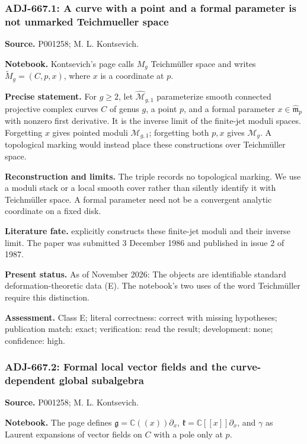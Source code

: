 \subsubsection{ADJ-667.1: A curve with a point and a formal parameter is not unmarked Teichmueller space}
\noindent\textbf{Source.} P001258; M. L. Kontsevich.\par
\noindent\textbf{Notebook.} Kontsevich's page calls \(M_g\) Teichm\"uller space and writes \(\widetilde M_g=(C,p,x)\), where \(x\) is a coordinate at \(p\).\par

\noindent\textbf{Precise statement.} For \(g\ge2\), let \(\widehat{\mathcal M}_{g,1}\) parameterize smooth connected projective complex curves \(C\) of genus \(g\), a point \(p\), and a formal parameter \(x\in\widehat{\mathfrak m}_p\) with nonzero first derivative. It is the inverse limit of the finite-jet moduli spaces. Forgetting \(x\) gives pointed moduli \(\mathcal M_{g,1}\); forgetting both \(p,x\) gives \(\mathcal M_g\). A topological marking would instead place these constructions over Teichm\"uller space.\par

\noindent\textbf{Reconstruction and limits.} The triple records no topological marking. We use a moduli stack or a local smooth cover rather than silently identify it with Teichm\"uller space. A formal parameter need not be a convergent analytic coordinate on a fixed disk.\par

\noindent\textbf{Literature fate.} \citet[\S1]{kontsevich1987virasoro} explicitly constructs these finite-jet moduli and their inverse limit. The paper was submitted 3 December 1986 and published in issue 2 of 1987.\par

\noindent\textbf{Present status.} As of November 2026: The objects are identifiable standard deformation-theoretic data (E). The notebook's two uses of the word Teichm\"uller require this distinction.\par

\noindent\textbf{Assessment.} Class E; literal correctness: correct with missing hypotheses; publication match: exact; verification: read the result; development: none; confidence: high.\par

\subsubsection{ADJ-667.2: Formal local vector fields and the curve-dependent global subalgebra}
\noindent\textbf{Source.} P001258; M. L. Kontsevich.\par
\noindent\textbf{Notebook.} The page defines \(\mathfrak g=\mathbb C((x))\partial_x\), \(\mathfrak k=\mathbb C[[x]]\partial_x\), and \(\gamma\) as Laurent expansions of vector fields on \(C\) with a pole only at \(p\).\par


